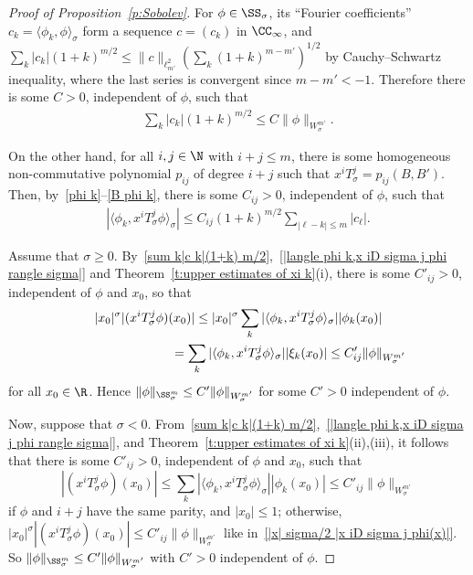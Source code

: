 \begin{proof}[Proof of Proposition~\ref{p:Sobolev}]
  For $\phi\in\SS_\sigma$, its ``Fourier coef\/f\/icients'' $c_k=\langle\phi_k,\phi\rangle_\sigma$ form a sequence $c=(c_k)$ in $\CC_\infty$, and $\sum_k|c_k| (1+k)^{m/2}\le\|c\|_{\ell^2_{m'}}(\sum_k(1+k)^{m-m'})^{1/2}$ by Cauchy--Schwartz inequality, where the last series is convergent since $m-m'<-1$. Therefore there is some $C>0$, independent of $\phi$, such that
    \begin{gather}\label{sum k|c k|(1+k) m/2}
      \sum_k|c_k| (1+k)^{m/2}\le C \|\phi\|_{W_\sigma^{m'}} .
    \end{gather}

  On the other hand, for all $i,j\in\N$ with $i+j\le m$, there is some homogeneous non-commutative polynomial $p_{ij}$ of degree $i+j$ such that $x^iT_\sigma^j=p_{ij}(B,B')$. Then, by~\eqref{phi k}--\eqref{B phi k}, there is some $C_{ij}>0$, independent of $\phi$, such that
    \begin{gather}\label{|langle phi k,x iD sigma j phi rangle sigma|}
      |\langle\phi_k,x^iT_\sigma^j\phi\rangle_\sigma|\le C_{ij}(1+k)^{m/2}\sum_{|\ell-k|\le m}|c_\ell| .
    \end{gather}

 Assume that $\sigma\ge0$. By~\eqref{sum k|c k|(1+k) m/2},~\eqref{|langle phi k,x iD sigma j phi rangle sigma|} and Theorem~\ref{t:upper estimates of xi k}(i), there is some $C'_{ij}>0$, independent of $\phi$ and $x_0$, so that
    \begin{gather}
      |x_0|^\sigma |(x^iT_\sigma^j\phi)(x_0)|\le |x_0|^\sigma\sum_k|\langle\phi_k,x^iT_\sigma^j\phi\rangle_\sigma| |\phi_k(x_0)|\nonumber\\
 \hphantom{|x_0|^\sigma |(x^iT_\sigma^j\phi)(x_0)|}{}
      =\sum_k|\langle\phi_k,x^iT_\sigma^j\phi\rangle_\sigma| |\xi_k(x_0)|\le C'_{ij} \|\phi\|_{W_\sigma^{m'}}\label{|x| sigma/2 |x iD sigma j phi(x)|}
    \end{gather}
  for all $x_0\in\R$. Hence $\|\phi\|_{\SS_\sigma^m}\le C'\|\phi\|_{W_\sigma^{m'}}$ for some $C'>0$ independent of $\phi$.

  Now, suppose that  $\sigma<0$. From~\eqref{sum k|c k|(1+k) m/2},~\eqref{|langle phi k,x iD sigma j phi rangle sigma|}, and Theorem~\ref{t:upper estimates of xi k}(ii),(iii), it follows that there is some $C'_{ij}>0$, independent of $\phi$ and $x_0$, such that
    \[
      |(x^iT_\sigma^j\phi)(x_0)|\le\sum_k|\langle\phi_k,x^iT_\sigma^j\phi\rangle_\sigma| |\phi_k(x_0)|
      \le C'_{ij} \|\phi\|_{W_\sigma^{m'}}
    \]
  if $\phi$ and $i+j$ have the same parity, and $|x_0|\le1$; otherwise, $|x_0|^\sigma |(x^iT_\sigma^j\phi)(x_0)|\le C'_{ij} \|\phi\|_{W_\sigma^{m'}}$ like in~\eqref{|x| sigma/2 |x iD sigma j phi(x)|}. So $\|\phi\|_{\SS_ \sigma ^m}\le C'\|\phi\|_{W_\sigma^{m'}}$ with $C'>0$ independent of $\phi$.
\end{proof}

